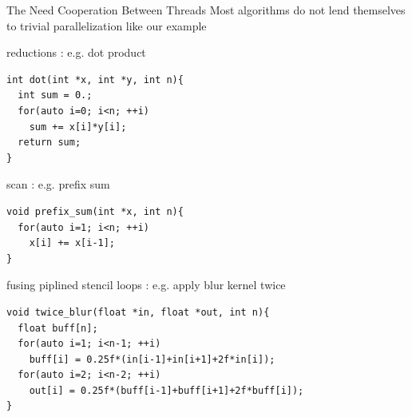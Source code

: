 
\begin{frame}[fragile]{The Need Cooperation Between Threads}
    \centering
    Most algorithms do not lend themselves to trivial parallelization like our \axpy example

    \begin{code}{reductions : e.g. dot product}
        \begin{lstlisting}[style=boxcudatiny]
int dot(int *x, int *y, int n){
  int sum = 0.;
  for(auto i=0; i<n; ++i)
    sum += x[i]*y[i];
  return sum;
}
        \end{lstlisting}
    \end{code}
\vspace{-7pt}
        \begin{code}{scan : e.g. prefix sum}
            \begin{lstlisting}[style=boxcudatiny]
void prefix_sum(int *x, int n){
  for(auto i=1; i<n; ++i)
    x[i] += x[i-1];
}
        \end{lstlisting}
    \end{code}
\vspace{-7pt}
    \begin{code}{fusing piplined stencil loops : e.g. apply blur kernel twice}
        \begin{lstlisting}[style=boxcudatiny]
void twice_blur(float *in, float *out, int n){
  float buff[n];
  for(auto i=1; i<n-1; ++i)
    buff[i] = 0.25f*(in[i-1]+in[i+1]+2f*in[i]);
  for(auto i=2; i<n-2; ++i)
    out[i] = 0.25f*(buff[i-1]+buff[i+1]+2f*buff[i]);
}
        \end{lstlisting}
    \end{code}

\end{frame}


